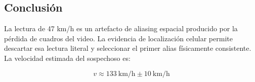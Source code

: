 \documentclass[conference]{IEEEtran}
\begin{document}
\subsection{Conclusión}

La lectura de 47 km/h es un artefacto de aliasing espacial producido por la pérdida de cuadros del video. 
La evidencia de localización celular permite descartar esa lectura literal y seleccionar el primer alias físicamente consistente. 
La velocidad estimada del sospechoso es:

\begin{equation}
v \approx 133\ \text{km/h} \pm 10\ \text{km/h}
\label{eq:velocidad_final}
\end{equation}



\end{document}
